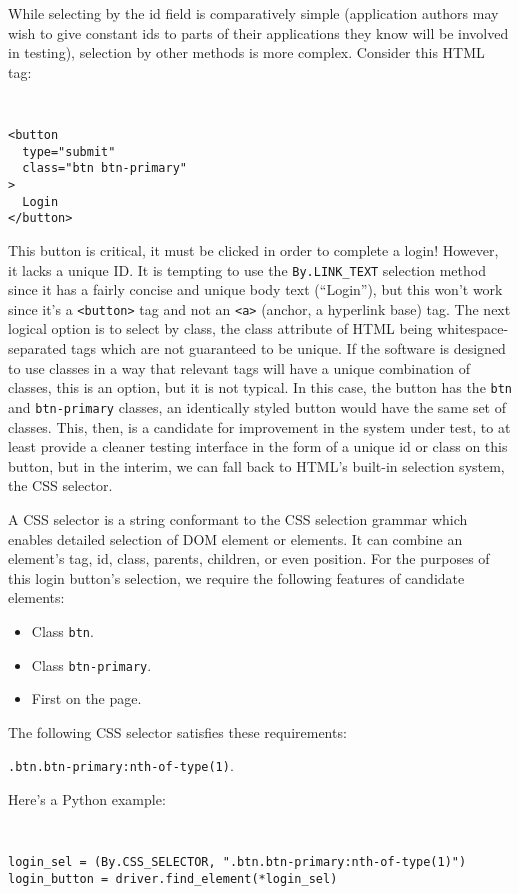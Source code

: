 While selecting by the id field is comparatively simple (application authors may wish to give constant ids to parts of their applications they know will be involved in testing)\citep{DOMStand78}, selection by other methods is more complex. Consider this HTML tag:

{\tt
\begin{verbatim}
<button
  type="submit"
  class="btn btn-primary"
>
  Login
</button>
\end{verbatim}
}

This button is critical, it must be clicked in order to complete a login! However, it lacks a unique ID. It is tempting to use the \texttt{By.LINK\_TEXT} selection method since it has a fairly concise and unique body text (``Login''), but this won't work since it's a \texttt{<button>} tag and not an \texttt{<a>} (anchor, a hyperlink base) tag. The next logical option is to select by class, the class attribute of HTML being whitespace-separated tags which are not guaranteed to be unique. If the software is designed to use classes in a way that relevant tags will have a unique combination of classes, this is an option, but it is not typical. In this case, the button has the \texttt{btn} and \texttt{btn-primary} classes, an identically styled button would have the same set of classes. This, then, is a candidate for improvement in the system under test, to at least provide a cleaner testing interface in the form of a unique id or class on this button, but in the interim, we can fall back to HTML's built-in selection system, the CSS selector.

A CSS selector is a string conformant to the CSS selection grammar \citep{Selector54} which enables detailed selection of DOM element or elements. It can combine an element's tag, id, class, parents, children, or even position. For the purposes of this login button's selection, we require the following features of candidate elements:
\begin{itemize}
\item Class \texttt{btn}.
\item Class \texttt{btn-primary}.
\item First on the page.
\end{itemize}

The following CSS selector satisfies these requirements:

\texttt{.btn.btn-primary:nth-of-type(1)}.

Here's a Python example:
{\tt
\begin{verbatim}
login_sel = (By.CSS_SELECTOR, ".btn.btn-primary:nth-of-type(1)")
login_button = driver.find_element(*login_sel)
\end{verbatim}
}

